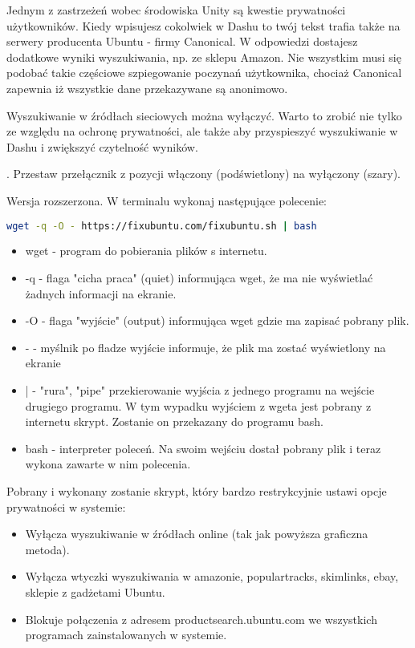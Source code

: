 Jednym z zastrzeżeń wobec środowiska Unity są kwestie prywatności użytkowników. Kiedy wpisujesz cokolwiek w Dashu to twój tekst trafia także na serwery producenta Ubuntu - firmy Canonical. W odpowiedzi dostajesz dodatkowe wyniki wyszukiwania, np. ze sklepu Amazon. Nie wszystkim musi się podobać takie częściowe szpiegowanie poczynań użytkownika, chociaż Canonical zapewnia iż wszystkie dane przekazywane są anonimowo.

Wyszukiwanie w źródłach sieciowych można wyłączyć. Warto to zrobić nie tylko ze względu na ochronę prywatności, ale także aby przyspieszyć wyszukiwanie w Dashu i zwiększyć czytelność wyników.

\noindent {}. Przestaw przełącznik z pozycji włączony (podświetlony) na wyłączony (szary).

Wersja rozszerzona. W terminalu wykonaj następujące polecenie:
\begin{lstlisting}[language=bash]
wget -q -O - https://fixubuntu.com/fixubuntu.sh | bash
\end{lstlisting}
\begin{itemize}
\item \textcolor{ubuntu_orange}{wget} - program do pobierania plików s internetu.
\item \textcolor{ubuntu_orange}{-q} - flaga "cicha praca" (quiet) informująca wget, że ma nie wyświetlać żadnych informacji na ekranie.
\item \textcolor{ubuntu_orange}{-O} - flaga "wyjście" (output) informująca wget gdzie ma zapisać pobrany plik.
\item \textcolor{ubuntu_orange}{-} - myślnik po fladze wyjście informuje, że plik ma zostać wyświetlony na ekranie
\item \textcolor{ubuntu_orange}{|} - "rura", "pipe" przekierowanie wyjścia z jednego programu na wejście drugiego programu. W tym wypadku wyjściem z wgeta jest pobrany z internetu skrypt. Zostanie on przekazany do programu bash.
\item \textcolor{ubuntu_orange}{bash} - interpreter poleceń. Na swoim wejściu dostał pobrany plik i teraz wykona zawarte w nim polecenia.
\end{itemize}
Pobrany i wykonany zostanie skrypt, który bardzo restrykcyjnie ustawi opcje prywatności w systemie:
\begin{itemize}
\item Wyłącza wyszukiwanie w źródłach online (tak jak powyższa graficzna metoda).
\item Wyłącza wtyczki wyszukiwania w amazonie, populartracks, skimlinks, ebay, sklepie z gadżetami Ubuntu.
\item Blokuje połączenia z adresem productsearch.ubuntu.com we wszystkich programach zainstalowanych w systemie.
\end{itemize}
